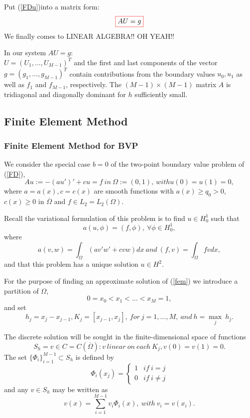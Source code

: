 \documentclass{beamer}
\begin{document}
\begin{frame}
Put (\ref{FDu})into a matrix form:
$$\fcolorbox{red}{white}{\textcolor{black}{$AU=g$}} $$
We finally comes to LINEAR ALGEBRA!! OH YEAH!!
\end{frame}

\begin{frame}
In our system $AU=g$:\\
$U = (U_1,\ldots, U_{M-1})^T$ and the first and last components of the
vector $g = (g_1,\ldots, g_{M-1})^T$ contain contributions from the boundary values
$u_0, u_1$ as well as $f_1$ and $f_{M-1}$, respectively. The $(M-1)\times(M-1)$ matrix $A$
is tridiagonal and diagonally dominant for $h$ sufficiently small.
\end{frame}
\subsection{Finite Element Method}
\begin{frame}
\frametitle{Finite Element Method for BVP}
We consider the special case $b=0$ of the two-point boundary value problem of (\ref{FD}),
$$Au:=-(au')'+cu=f \ in\ \Omega:=(0,1),\ with u(0)=u(1)=0,$$
where $a=a(x), c=c(x)$ are smooth functions with $a(x)\geq q_0>0$, $c(x)\geq 0$ in $\overline{\Omega}$ and $f\in L_2 = L_2(\Omega).$
\end{frame}
\begin{frame}
Recall the variational formulation of this problem is to find $u\in H_0^1$ such that
$$a(u,\phi) = (f,\phi), \ \forall\phi \in H_0^1,\label{fem}$$
where
$$ a(v,w) = \int_{\Omega}(av'w'+cvw)dx \ and\ (f,v) = \int_{\Omega}fv dx,$$
and that this problem has a unique solution $u\in H^2$.
\end{frame}
\begin{frame}
For the purpose of finding an approximate solution of (\ref{fem}) we introduce a partition of $\Omega$,
$$0=x_0<x_1<\ldots<x_M=1,$$
and set
$$h_j = x_j-x_{j-1}, K_j = [x_{j-1},x_j],\ for\ j = 1, \ldots , M,\ and\ h=\underset{j}{\max}\ h_j.$$
\end{frame}
\begin{frame}
The discrete solution will be sought in the finite-dimensional space of functions
$$S_h={v\in C=C(\overline{\Omega}): v\ linear\ on\ each\ K_j, v(0)=v(1)=0}.$$
The set $\{\Phi_i\}_{i=1}^{M-1}\subset S_h$ is defined by
\[
\Phi_i(x_j)=
\begin{cases}
1 & if\ i=j \\
0 & if\ i\neq j
\end{cases}
\] 
and any $v\in S_h$ may be written as
$$v(x)=\sum^{M-1}_{i=1}v_i\Phi_i(x),\ with\ v_i=v(x_i).$$
\end{frame}
\end{document}
